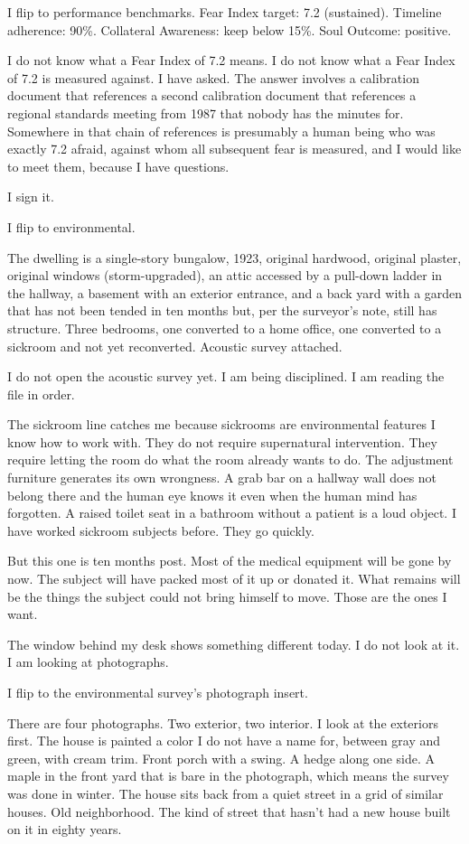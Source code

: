 I flip to performance benchmarks. Fear Index target: 7.2 (sustained). Timeline adherence: 90\%. Collateral Awareness: keep below 15\%. Soul Outcome: positive.

I do not know what a Fear Index of 7.2 means. I do not know what a Fear Index of 7.2 is measured against. I have asked. The answer involves a calibration document that references a second calibration document that references a regional standards meeting from 1987 that nobody has the minutes for. Somewhere in that chain of references is presumably a human being who was exactly 7.2 afraid, against whom all subsequent fear is measured, and I would like to meet them, because I have questions.

I sign it.

I flip to environmental.

The dwelling is a single-story bungalow, 1923, original hardwood, original plaster, original windows (storm-upgraded), an attic accessed by a pull-down ladder in the hallway, a basement with an exterior entrance, and a back yard with a garden that has not been tended in ten months but, per the surveyor's note, still has structure. Three bedrooms, one converted to a home office, one converted to a sickroom and not yet reconverted. Acoustic survey attached.

I do not open the acoustic survey yet. I am being disciplined. I am reading the file in order.

The sickroom line catches me because sickrooms are environmental features I know how to work with. They do not require supernatural intervention. They require letting the room do what the room already wants to do. The adjustment furniture generates its own wrongness. A grab bar on a hallway wall does not belong there and the human eye knows it even when the human mind has forgotten. A raised toilet seat in a bathroom without a patient is a loud object. I have worked sickroom subjects before. They go quickly.

But this one is ten months post. Most of the medical equipment will be gone by now. The subject will have packed most of it up or donated it. What remains will be the things the subject could not bring himself to move. Those are the ones I want.

The window behind my desk shows something different today. I do not look at it. I am looking at photographs.

I flip to the environmental survey's photograph insert.

There are four photographs. Two exterior, two interior. I look at the exteriors first. The house is painted a color I do not have a name for, between gray and green, with cream trim. Front porch with a swing. A hedge along one side. A maple in the front yard that is bare in the photograph, which means the survey was done in winter. The house sits back from a quiet street in a grid of similar houses. Old neighborhood. The kind of street that hasn't had a new house built on it in eighty years.

